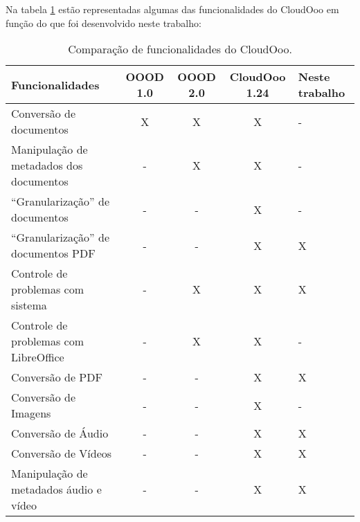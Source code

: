 Na tabela \ref{funclooo} estão representadas algumas das funcionalidades do CloudOoo em função do que foi desenvolvido neste trabalho:

\begin{table}
  \caption{Comparação de funcionalidades do CloudOoo.}
  \label{funclooo}
  \begin{tabular}[b]{|p{3.5cm}|c|c|c|p{1.5cm}|}
  \hline
  Funcionalidades & OOOD 1.0 & OOOD 2.0 & CloudOoo 1.24 & Neste trabalho \\
  \hline
  Conversão de documentos & X & X & X & - \\
  \hline
  Manipulação de metadados dos documentos & - & X & X & - \\
  \hline
  ``Granularização'' de documentos & - & - & X & - \\
  \hline
  ``Granularização'' de documentos PDF & - & - & X & X \\
  \hline
  Controle de problemas com sistema & - & X & X & X \\
  \hline
  Controle de problemas com LibreOffice & - & X & X & - \\
  \hline
  Conversão de PDF & - & - & X & X \\
  \hline
  Conversão de Imagens & - & - & X & - \\
  \hline
  Conversão de Áudio & - & - & X & X \\
  \hline
  Conversão de Vídeos & - & - & X & X \\
  \hline
  Manipulação de metadados áudio e vídeo & - & - & X & X \\
  \hline
  \end{tabular}
\end{table}

